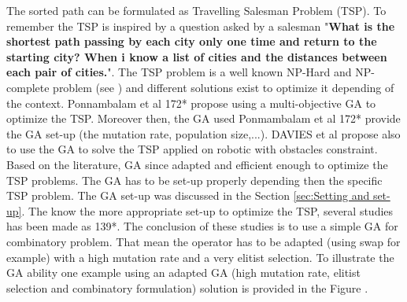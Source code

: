 The sorted path can be formulated as Travelling Salesman Problem (TSP). To remember the TSP is inspired by a question asked by a salesman "\textbf{What is the shortest path passing by each city only one time and return to the starting city? When i know a list of cities and the distances between each pair of cities.}". The TSP problem is a well known NP-Hard and NP-complete problem (see \citep{236*karp1972}) and different solutions exist to optimize it depending of the context. 
Ponnambalam et al 172* \cite{172*ponnambalam2004} propose using a multi-objective GA to optimize the TSP. Moreover then, the GA used Ponmambalam et al 172* \cite{172*ponnambalam2004} provide the GA set-up (the mutation rate, population size,...). DAVIES et al \cite{56*davies2006} propose also to use the GA to solve the TSP applied on robotic with obstacles constraint. \\
Based on the literature, GA since adapted and efficient enough to optimize the TSP problems.
The GA has to be set-up properly depending then the specific TSP problem. The GA set-up was discussed in the Section \ref{sec:Setting and set-up}. The know the more appropriate set-up to optimize the TSP, several studies has been made  as \citep{68*muhlenbein1989,80*serpell2010,139*razali2011} 139*. The conclusion of these studies is to use a simple GA for combinatory problem. That mean the operator has to be adapted (using swap for example) with a high mutation rate and a very elitist selection.
To illustrate the GA ability one example using an adapted GA (high mutation rate,  elitist selection and combinatory formulation) solution is provided in the Figure .




